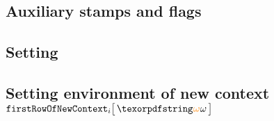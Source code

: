 \subsection{Auxiliary stamps and flags \lispDone{}}                                              \label{hub: generalities: auxiliary stamps and flags}                      
\subsection{Setting \txEndStamp{} \lispDone{}}                                                   \label{hub: generalities: tx end stamp}                                    
\subsection{Setting environment of new context $\firstRowOfNewContext {i}{\relof}$ \lispDone{}}  \label{hub: generalities: first row of new context}                        
